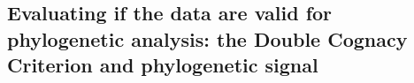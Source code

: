 \documentclass[12pt,letterpaper]{article}
\begin{document}






\FloatBarrier
\subsection{Evaluating if the data are valid for phylogenetic analysis: the Double Cognacy Criterion and phylogenetic signal}
\label{sec:is_it_valid}
\end{document}
